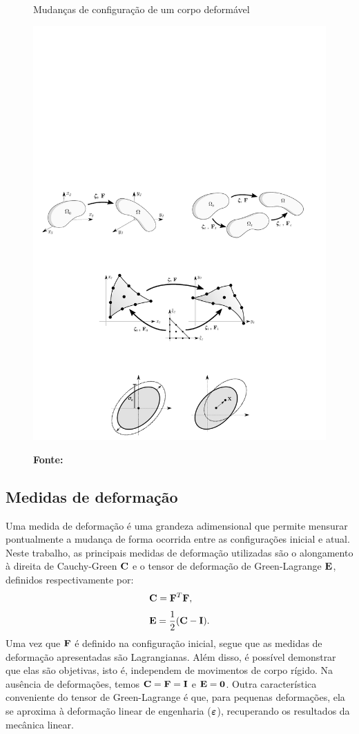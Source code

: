 \documentclass[Tese.tex]{subfiles}
\begin{document}
\begin{figure}[h]
	\centering
	\caption{Mudanças de configuração de um corpo deformável}
	\label{fig:cinematica}
	{\includegraphics[scale=1.0]{Figuras/kinematics0.pdf}}	
	\caption*{\textbf{Fonte:} }
\end{figure}

\subsection{Medidas de deformação}

Uma medida de deformação é uma grandeza adimensional que permite mensurar pontualmente a mudança de forma ocorrida entre as configurações inicial e atual. Neste trabalho, as principais medidas de deformação utilizadas são o alongamento à direita de Cauchy-Green $\mathbf{C}$ e o tensor de deformação de Green-Lagrange $\mathbf{E}$, definidos respectivamente por:
\begin{align}
&\mathbf{C}=\mathbf{F}^T\mathbf{F} \label{eq:alongamentocauchy},\\[0.1cm]
&\mathbf{E} = \dfrac{1}{2}(\mathbf{C}-\mathbf{I}). \label{eq:E}
\end{align}
Uma vez que $\mathbf{F}$ é definido na configuração inicial, segue que as medidas de deformação apresentadas são Lagrangianas. Além disso, é possível demonstrar que elas são objetivas, isto é, independem de movimentos de corpo rígido. Na ausência de deformações, temos $\mathbf{C}=\mathbf{F}=\mathbf{I}$ e $\mathbf{E}=\mathbf{0}$. Outra característica conveniente do tensor de Green-Lagrange é que, para pequenas deformações, ela se aproxima à deformação linear de engenharia ($\boldsymbol{\varepsilon}$), recuperando os resultados da mecânica linear.
\end{document}
